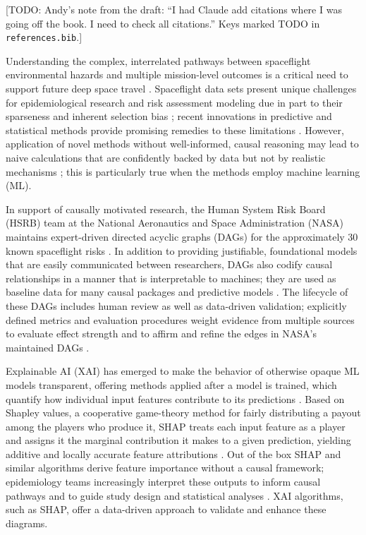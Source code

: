 \documentclass[11pt]{article}
\newcommand{\todo}[1]{\textcolor{red!70!black}{[TODO: #1]}}
\begin{document}
\todo{Andy's note from the draft: ``I had Claude add citations where I was
going off the book. I need to check all citations.'' Keys marked TODO in
\texttt{references.bib}.}

Understanding the complex, interrelated pathways between spaceflight
environmental hazards and multiple mission-level outcomes is a critical need
to support future deep space travel \citep{Reynolds2022,NASA2022DAGs}.
Spaceflight data sets present unique challenges for epidemiological research
and risk assessment modeling due in part to their sparseness and inherent
selection bias \citep{ReynoldsDay2019a,Reynolds2023}; recent innovations in
predictive and statistical methods provide promising remedies to these
limitations \citep{Li2023,Sanders2023,Scott2023}. However, application of
novel methods without well-informed, causal reasoning may lead to naive
calculations that are confidently backed by data but not by realistic
mechanisms \citep{HookerMentch2019,Reisach2021}; this is particularly true
when the methods employ machine learning (ML).

In support of causally motivated research, the Human System Risk Board
(HSRB) team at the National Aeronautics and Space Administration (NASA)
maintains expert-driven directed acyclic graphs (DAGs) for the approximately
30 known spaceflight risks \citep{Antonsen2024}. In addition to providing
justifiable, foundational models that are easily communicated between
researchers, DAGs also codify causal relationships in a manner that is
interpretable to machines; they are used as baseline data for many causal
packages and predictive models \citep{Kalisch2012,Textor2016,SharmaKiciman2020}.
The lifecycle of these DAGs includes human review as well as data-driven
validation; explicitly defined metrics and evaluation procedures weight
evidence from multiple sources to evaluate effect strength and to affirm and
refine the edges in NASA's maintained DAGs \citep{Reynolds2022,Antonsen2023,Ward2024}.

Explainable AI (XAI) has emerged to make the behavior of otherwise opaque ML
models transparent, offering methods applied after a model is trained, which
quantify how individual input features contribute to its predictions
\citep{BarredoArrieta2020,ViloneLongo2021}. Based on Shapley values, a
cooperative game-theory method for fairly distributing a payout among the
players who produce it, SHAP treats each input feature as a player and
assigns it the marginal contribution it makes to a given prediction, yielding
additive and locally accurate feature attributions
\citep{LundbergLee2017,Shapley1953}. Out of the box SHAP and similar
algorithms derive feature importance without a causal framework;
epidemiology teams increasingly interpret these outputs to inform causal
pathways and to guide study design and statistical analyses
\citep{Lundberg2020,AnnalsEpi2025}. XAI algorithms, such as SHAP, offer a
data-driven approach to validate and enhance these diagrams.
\end{document}
